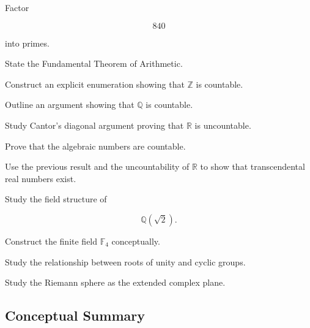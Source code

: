\begin{exercise}[2]
Factor

\[
840
\]

into primes.
\end{exercise}

\begin{exercise}[3]
State the Fundamental Theorem of Arithmetic.
\end{exercise}

\begin{exercise}[4]
Construct an explicit enumeration showing that \(\mathbb{Z}\) is countable.
\end{exercise}

\begin{exercise}[4]
Outline an argument showing that \(\mathbb{Q}\) is countable.
\end{exercise}

\begin{exercise}[4]
Study Cantor's diagonal argument proving that \(\mathbb{R}\) is uncountable.
\end{exercise}

\begin{exercise}[4]
Prove that the algebraic numbers are countable.
\end{exercise}

\begin{exercise}[4]
Use the previous result and the uncountability of \(\mathbb{R}\) to show that
transcendental real numbers exist.
\end{exercise}

\begin{exercise}[4]
Study the field structure of

\[
\mathbb{Q}(\sqrt2).
\]
\end{exercise}

\begin{exercise}[4]
Construct the finite field \(\mathbb{F}_4\) conceptually.
\end{exercise}

\begin{exercise}[4]
Study the relationship between roots of unity and cyclic groups.
\end{exercise}

\begin{exercise}[4]
Study the Riemann sphere as the extended complex plane.
\end{exercise}

\subsection{Conceptual Summary}
\label{subsec:number-systems-summary}

